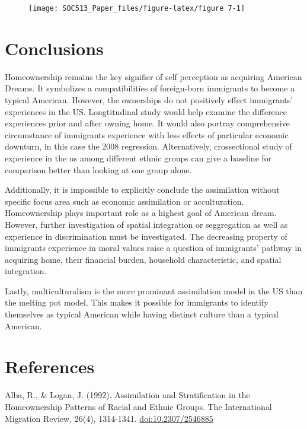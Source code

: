 \documentclass[11pt,]{article}
\begin{document}
\begin{figure}

{\centering \texttt{[image: SOC513\_Paper\_files/figure-latex/figure 7-1]} 

}

\end{figure}

\hypertarget{conclusions}{%
\section{Conclusions}\label{conclusions}}

Homeownership remains the key signifier of self perception as acquiring
American Dreams. It symbolizes a compatibilities of foreign-born
immigrants to become a typical American. However, the ownerships do not
positively effect immigrants' experiences in the US. Longtitudinal study
would help examine the difference experiences prior and after owning
home. It would also portray comprehensive circumstance of immigrants
experience with less effects of particular economic downturn, in this
case the 2008 regression. Alternatively, crossectional study of
experience in the us among different ethnic groups can give a baseline
for comparison better than looking at one group alone.

Additionally, it is impossible to explicitly conclude the assimilation
without specific focus area such as economic assimilation or
acculturation. Homeownership plays important role as a highest goal of
American dream. However, further investigation of spatial integration or
seggregation as well as experience in discrimination must be
investigated. The decreasing property of immigrants experience in moral
values raise a question of immigrants' pathway in acquiring home, their
financial burden, household characteristic, and spatial integration.

Lastly, multiculturalism is the more prominant assimilation model in the
US than the melting pot model. This makes it possible for immigrants to
identify themselves as typical American while having distinct culture
than a typical American.

\hypertarget{references}{%
\section{References}\label{references}}

Alba, R., \& Logan, J. (1992). Assimilation and Stratification in the
Homeownership Patterns of Racial and Ethnic Groups. The International
Migration Review, 26(4), 1314-1341. \url{doi:10.2307/2546885}
\end{document}

